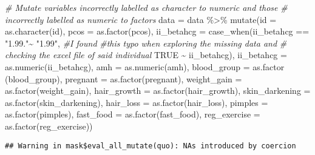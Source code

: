 \documentclass[
]{article}
\newenvironment{Shaded}{\begin{snugshade}}{\end{snugshade}}
\newcommand{\AttributeTok}[1]{\textcolor[rgb]{0.77,0.63,0.00}{#1}}
\newcommand{\CommentTok}[1]{\textcolor[rgb]{0.56,0.35,0.01}{\textit{#1}}}
\newcommand{\ConstantTok}[1]{\textcolor[rgb]{0.00,0.00,0.00}{#1}}
\newcommand{\FunctionTok}[1]{\textcolor[rgb]{0.00,0.00,0.00}{#1}}
\newcommand{\NormalTok}[1]{#1}
\newcommand{\OtherTok}[1]{\textcolor[rgb]{0.56,0.35,0.01}{#1}}
\newcommand{\SpecialCharTok}[1]{\textcolor[rgb]{0.00,0.00,0.00}{#1}}
\newcommand{\StringTok}[1]{\textcolor[rgb]{0.31,0.60,0.02}{#1}}
\begin{document}
\begin{Shaded}
\begin{Highlighting}[]
\CommentTok{\# Mutate variables incorrectly labelled as character to numeric and those }
\CommentTok{\# incorrectly labelled as numeric to factors}
\NormalTok{data }\OtherTok{=}\NormalTok{ data }\SpecialCharTok{\%\textgreater{}\%} 
  \FunctionTok{mutate}\NormalTok{(}\AttributeTok{id =} \FunctionTok{as.character}\NormalTok{(id),}
         \AttributeTok{pcos =} \FunctionTok{as.factor}\NormalTok{(pcos),}
         \AttributeTok{ii\_betahcg =} \FunctionTok{case\_when}\NormalTok{(ii\_betahcg }\SpecialCharTok{==} \StringTok{"1.99."}\SpecialCharTok{\textasciitilde{}} \StringTok{"1.99"}\NormalTok{, }\CommentTok{\#I found}
                                          \CommentTok{\#this typo when exploring the missing data and}
                                          \CommentTok{\# checking the excel file of said individual}
                                          \ConstantTok{TRUE} \SpecialCharTok{\textasciitilde{}}\NormalTok{ ii\_betahcg),}
         \AttributeTok{ii\_betahcg =} \FunctionTok{as.numeric}\NormalTok{(ii\_betahcg),}
         \AttributeTok{amh =} \FunctionTok{as.numeric}\NormalTok{(amh),}
         \AttributeTok{blood\_group =} \FunctionTok{as.factor}\NormalTok{ (blood\_group),}
         \AttributeTok{pregnant =} \FunctionTok{as.factor}\NormalTok{(pregnant),}
         \AttributeTok{weight\_gain =} \FunctionTok{as.factor}\NormalTok{(weight\_gain),}
         \AttributeTok{hair\_growth =} \FunctionTok{as.factor}\NormalTok{(hair\_growth),}
         \AttributeTok{skin\_darkening =} \FunctionTok{as.factor}\NormalTok{(skin\_darkening),}
         \AttributeTok{hair\_loss =} \FunctionTok{as.factor}\NormalTok{(hair\_loss),}
         \AttributeTok{pimples =} \FunctionTok{as.factor}\NormalTok{(pimples),}
         \AttributeTok{fast\_food =} \FunctionTok{as.factor}\NormalTok{(fast\_food),}
         \AttributeTok{reg\_exercise =} \FunctionTok{as.factor}\NormalTok{(reg\_exercise))}
\end{Highlighting}
\end{Shaded}

\begin{verbatim}
## Warning in mask$eval_all_mutate(quo): NAs introduced by coercion
\end{verbatim}
\end{document}
